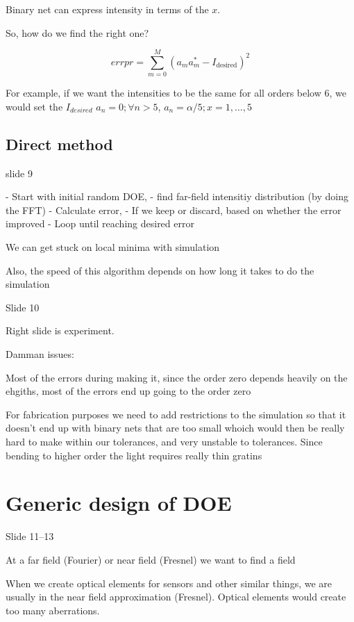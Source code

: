 \documentclass[../main/main.tex]{subfiles}
\begin{document}
Binary net  can express intensity in terms of the $x$.


So, how do we find the right one?

\begin{equation}
	errpr = \sum_{m=0}^M (a_m a_m^* - I_{\textrm{desired}})^2
\end{equation}

For example, if we want the intensities to be the same for all orders below 6, we would set the $I_{desired}$ $a_n = 0; \forall n > 5$, $a_n = \alpha/5; x=1,\ldots,5$

\subsection{Direct method}

slide 9

- Start with initial random DOE,
- find far-field intensitiy distribution (by doing the FFT)
- Calculate error,
- If we keep or discard, based on whether the error improved
- Loop until reaching desired error

We can get stuck on local minima with simulation

Also, the speed of this algorithm depends on how long it takes to do the simulation

Slide 10


Right slide is experiment.

Damman issues:

Most of the errors during making it, since the order zero depends heavily on the ehgiths, most of the errors end up going to the order zero

For fabrication purposes we need to add restrictions to the simulation so that it doesn't end up with binary nets that are too small whoich would then be really hard to make within our tolerances, and very unstable to tolerances. Since bending to higher order the light requires really thin gratins


\section{Generic design of DOE}
Slide 11--13

At a far field (Fourier) or near field (Fresnel) we want to find a field

When we create optical elements for sensors and other similar things, we are usually in the near field approximation (Fresnel). Optical elements would create too many aberrations.
\end{document}
